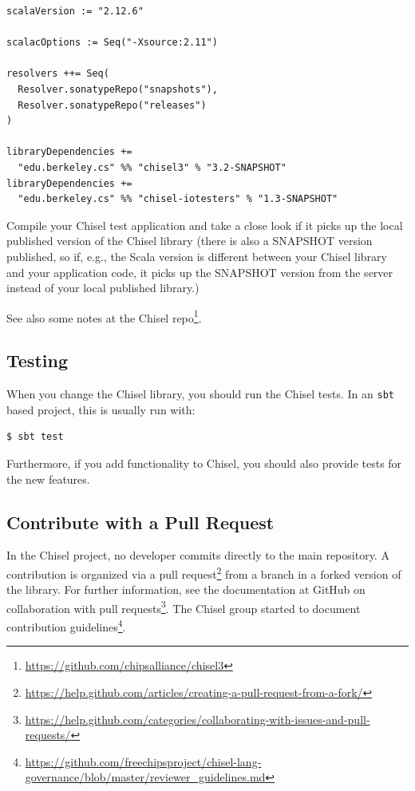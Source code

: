 \documentclass[%
    10pt,
    headinclude, footexclude,
    openright, %
    notitlepage,
    cleardoubleempty,
    headsepline,
    pointlessnumbers,
    bibtotoc, idxtotoc,
    ]{scrbook}
\newcommand{\code}[1]{{\small{\texttt{#1}}}}
\newcommand{\myref}[2]{\href{#1}{#2}}
\renewcommand{\myref}[2]{{#2}{\footnote{\url{#1}}}}
\begin{document}
\begin{verbatim}
scalaVersion := "2.12.6"

scalacOptions := Seq("-Xsource:2.11")

resolvers ++= Seq(
  Resolver.sonatypeRepo("snapshots"),
  Resolver.sonatypeRepo("releases")
)

libraryDependencies +=
  "edu.berkeley.cs" %% "chisel3" % "3.2-SNAPSHOT"
libraryDependencies +=
  "edu.berkeley.cs" %% "chisel-iotesters" % "1.3-SNAPSHOT"
\end{verbatim}

Compile your Chisel test application and take a close look if it picks up the local published
version of the Chisel library (there is also a SNAPSHOT version published, so if, e.g.,
the Scala version is different between your Chisel library and your application code,
it picks up the SNAPSHOT version from the server instead of your local published
library.)

See also \myref{https://github.com/chipsalliance/chisel3}{some notes
at the Chisel repo}.

\subsection{Testing}

When you change the Chisel library, you should run the Chisel tests.
In an \code{sbt} based project, this is usually run with:

\begin{verbatim}
$ sbt test
\end{verbatim}

Furthermore, if you add functionality to Chisel, you should also provide tests for the
new features.

\subsection{Contribute with a Pull Request}

In the Chisel project, no developer commits directly to the main repository.
A contribution is organized via a
\myref{https://help.github.com/articles/creating-a-pull-request-from-a-fork/}{pull request}
from a branch in a forked version of the library.
For further information, see the documentation at GitHub on
\myref{https://help.github.com/categories/collaborating-with-issues-and-pull-requests/}{collaboration with
pull requests}.
The Chisel group started to document
\myref{https://github.com/freechipsproject/chisel-lang-governance/blob/master/reviewer_guidelines.md}{contribution
guidelines}.
\end{document}
